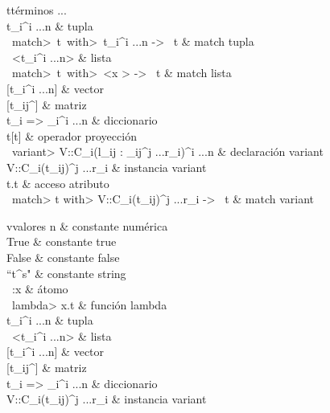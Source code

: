 \hspace*{-2cm}
\begin{grammar}{t}{términos}
... \\
t_i^{i ...n} & tupla \\
\ \<match>\ t\ \<with>\ t_i^{i ...n} \mathligsoff -> \mathligson\ t & match tupla \\
\ <t_i^{i ...n}> & lista \\
\ \<match>\ t\ \<with>\ <x \mid {}> \mathligsoff -> \mathligson\ t & match lista \\
{} [{t_i}^{i ...n}] & vector \\
{} [t_{ij}^{}] & matriz \\
{t_i => _i}^{i ...n} & diccionario\\
t[t]          & operador proyección \\
\ \<variant> V::C_i({l_{ij} : \tau_{ij}}^{j ...r_i})^{i ...n} & declaración variant \\
V::C_i(t_{ij})^{j ...r_i} & instancia variant \\
t.t           & acceso atributo \\
\ \<match> t \<with> V::C_i(t_{ij})^{j ...r_i} \mathligsoff -> \mathligson\ t & match variant \\
\end{grammar}

\bigskip
\hspace*{-2cm}
\begin{grammar}{v}{valores}
n             & constante numérica \\
True          & constante true \\
False          & constante false \\
``t^s"         & constante string \\
\ :x            & átomo \\
\ \<lambda> x.t     & función lambda \\
t_i^{i ...n} & tupla \\
\ <t_i^{i ...n}> & lista \\
{} [{t_i}^{i ...n}] & vector \\
{} [t_{ij}^{}] & matriz \\
{t_i => _i}^{i ...n} & diccionario\\
V::C_i(t_{ij})^{j ...r_i} & instancia variant \\
\end{grammar}

